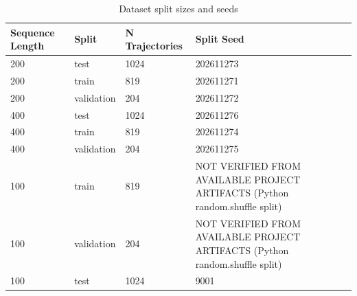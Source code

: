 \begin{table}[t]
\centering
\caption{Dataset split sizes and seeds}
\label{tab:splits}
\scriptsize
\begin{tabular}{llll}
\hline
Sequence Length & Split & N Trajectories & Split Seed \\
\hline
200 & test & 1024 & 202611273 \\
200 & train & 819 & 202611271 \\
200 & validation & 204 & 202611272 \\
400 & test & 1024 & 202611276 \\
400 & train & 819 & 202611274 \\
400 & validation & 204 & 202611275 \\
100 & train & 819 & NOT VERIFIED FROM AVAILABLE PROJECT ARTIFACTS (Python random.shuffle split) \\
100 & validation & 204 & NOT VERIFIED FROM AVAILABLE PROJECT ARTIFACTS (Python random.shuffle split) \\
100 & test & 1024 & 9001 \\
\hline
\end{tabular}
\end{table}
